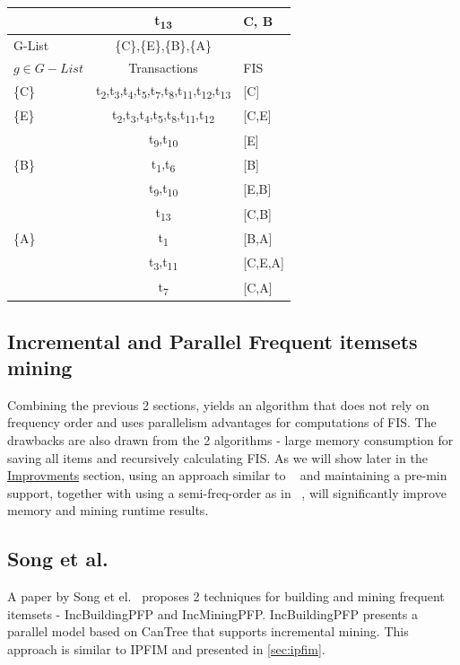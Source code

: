 \begin{table}[h!]
\begin{center}
\begin{tabular}{l|c|l}
	   & t\textsubscript{13} & {C, B}\\
		\hline
	   G-List & \{C\},\{E\},\{B\},\{A\} &\\
		\hline
		$g\in G-List$ & Transactions & FIS\\
		\hline
		\{C\}& t\textsubscript{2},t\textsubscript{3},t\textsubscript{4},t\textsubscript{5},t\textsubscript{7},t\textsubscript{8},t\textsubscript{11},t\textsubscript{12},t\textsubscript{13}& [C]\\
		\{E\}& 		t\textsubscript{2},t\textsubscript{3},t\textsubscript{4},t\textsubscript{5},t\textsubscript{8},t\textsubscript{11},t\textsubscript{12} & [C,E]\\
		& t\textsubscript{9},t\textsubscript{10} & [E]\\
		\{B\} &t\textsubscript{1},t\textsubscript{6} & [B]\\
		&t\textsubscript{9},t\textsubscript{10} & [E,B]\\
		&t\textsubscript{13} & [C,B]\\
		\{A\} &t\textsubscript{1} & [B,A]\\
		&t\textsubscript{3},t\textsubscript{11} & [C,E,A]\\
		&t\textsubscript{7} & [C,A]\\
    \end{tabular}
  \end{center}
\end{table}

\subsection{Incremental and Parallel Frequent itemsets mining}
Combining the previous 2 sections, yields an algorithm that does not rely on frequency order and uses parallelism advantages for computations of FIS.
The drawbacks are also drawn from the 2 algorithms - large memory consumption for saving all items and recursively calculating FIS. As we will show later in the \hyperref[sec:improvements]{Improvments} section, using an approach similar to ~\cite{kohefficient} and maintaining a pre-min support, together with using a semi-freq-order as in ~\cite{tanbeer2009efficient}, will significantly improve memory and mining runtime results.



\subsection{Song et al. }
\label{sec:song}
A paper by Song et el.~\cite{song2017} proposes 2 techniques for building and mining frequent itemsets - IncBuildingPFP and IncMiningPFP. IncBuildingPFP presents a parallel model based on CanTree that supports incremental mining. This approach is similar to IPFIM and presented in \autoref{sec:ipfim}.  


